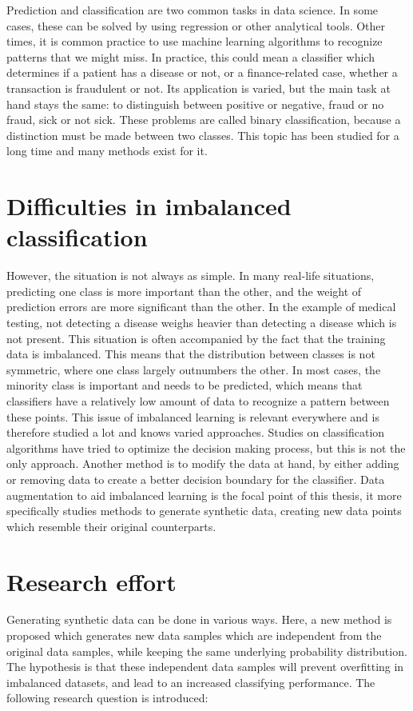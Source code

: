Prediction and classification are two common tasks in data science. In some cases, these can be solved by using regression or other analytical tools. Other times, it is common practice to use machine learning algorithms to recognize patterns that we might miss. In practice, this could mean a classifier which determines if a patient has a disease or not, or a finance-related case, whether a transaction is fraudulent or not. Its application is varied, but the main task at hand stays the same: to distinguish between positive or negative, fraud or no fraud, sick or not sick. These problems are called binary classification, because a distinction must be made between two classes. This topic has been studied for a long time and many methods exist for it. 

\section{Difficulties in imbalanced classification}
However, the situation is not always as simple. In many real-life situations, predicting one class is more important than the other, and the weight of prediction errors are more significant than the other. In the example of medical testing, not detecting a disease weighs heavier than detecting a disease which is not present. This situation is often accompanied by the fact that the training data is imbalanced. This means that the distribution between classes is not symmetric, where one class largely outnumbers the other. In most cases, the minority class is important and needs to be predicted, which means that classifiers have a relatively low amount of data to recognize a pattern between these points. This issue of imbalanced learning is relevant everywhere and is therefore studied a lot and knows varied approaches. Studies on classification algorithms have tried to optimize the decision making process, but this is not the only approach. Another method is to modify the data at hand, by either adding or removing data to create a better decision boundary for the classifier. Data augmentation to aid imbalanced learning is the focal point of this thesis, it more specifically studies methods to generate synthetic data, creating new data points which resemble their original counterparts. 

\section{Research effort}
Generating synthetic data can be done in various ways. Here, a new method is proposed which generates new data samples which are independent from the original data samples, while keeping the same underlying probability distribution. The hypothesis is that these independent data samples will prevent overfitting in imbalanced datasets, and lead to an increased classifying performance. The following research question is introduced:

